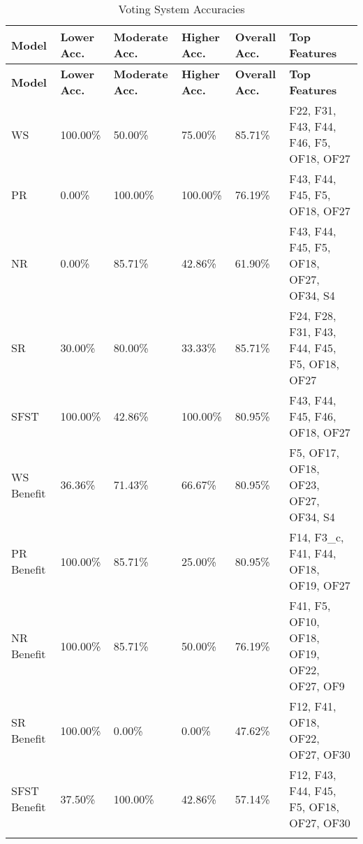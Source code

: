 \begin{longtable}{|p{1.5cm}|p{2.0cm}|p{2.0cm}|p{2.0cm}|p{2.0cm}|p{4cm}|}
\hline
\textbf{Model} & \textbf{Lower Acc.} & \textbf{Moderate Acc.} & \textbf{Higher Acc.} & \textbf{Overall Acc.} & \textbf{Top Features} \\ \hline
\endfirsthead
\hline
\textbf{Model} & \textbf{Lower Acc.} & \textbf{Moderate Acc.} & \textbf{Higher Acc.} & \textbf{Overall Acc.} & \textbf{Top Features} \\ \hline
\endhead

WS & 100.00\% & 50.00\% & 75.00\% & 85.71\% & F22, F31, F43, F44, F46, F5, OF18, OF27 \\ \hline
PR & 0.00\% & 100.00\% & 100.00\% & 76.19\% & F43, F44, F45, F5, OF18, OF27 \\ \hline
NR & 0.00\% & 85.71\% & 42.86\% & 61.90\% & F43, F44, F45, F5, OF18, OF27, OF34, S4 \\ \hline
SR & 30.00\% & 80.00\% & 33.33\% & 85.71\% & F24, F28, F31, F43, F44, F45, F5, OF18, OF27 \\ \hline
SFST & 100.00\% & 42.86\% & 100.00\% & 80.95\% & F43, F44, F45, F46, OF18, OF27 \\ \hline
WS Benefit & 36.36\% & 71.43\% & 66.67\% & 80.95\% & F5, OF17, OF18, OF23, OF27, OF34, S4 \\ \hline
PR Benefit & 100.00\% & 85.71\% & 25.00\% & 80.95\% & F14, F3\_c, F41, F44, OF18, OF19, OF27 \\ \hline
NR Benefit & 100.00\% & 85.71\% & 50.00\% & 76.19\% & F41, F5, OF10, OF18, OF19, OF22, OF27, OF9 \\ \hline
SR Benefit & 100.00\% & 0.00\% & 0.00\% & 47.62\% & F12, F41, OF18, OF22, OF27, OF30 \\ \hline
SFST Benefit & 37.50\% & 100.00\% & 42.86\% & 57.14\% & F12, F43, F44, F45, F5, OF18, OF27, OF30 \\ \hline

\caption{Voting System Accuracies}
\label{tab:grouping_3c}
\end{longtable}
